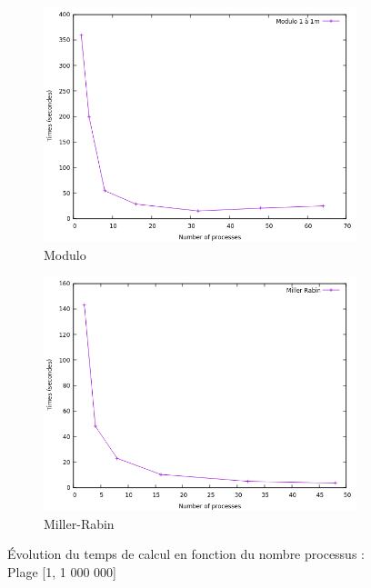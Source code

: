 \begin{figure}
        \begin{subfigure}[b]{0.85\textwidth}   
            \centering 
            \includegraphics[width=\textwidth]{Modulo_1M.png}
            \caption[]%
            {{\small Modulo}}    
            \label{fig:sub3}
        \end{subfigure}
        \hfill
        \begin{subfigure}[b]{0.85\textwidth}   
            \centering 
            \includegraphics[width=\textwidth]{Miller.png}
            \caption[]%
            {{\small Miller-Rabin}}    
            \label{fig:sub4}
        \end{subfigure}
        \caption[ Évolution du temps de calcul en fonction du nombre processus]
        {\small Évolution du temps de calcul en fonction du nombre processus : Plage [1, 1 000 000]} 
        \label{fig:3}
\end{figure}

